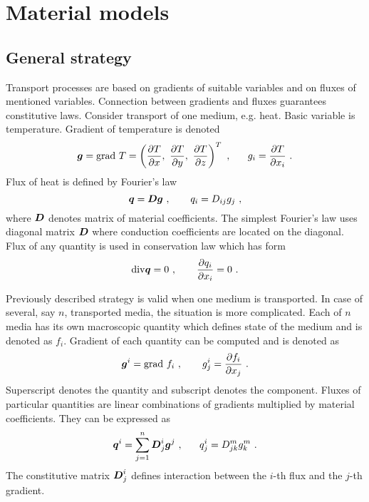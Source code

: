 \chapter{Material models}
\label{matmodels}

\section{General strategy}

Transport processes are based on gradients of suitable variables and on fluxes of mentioned variables.
Connection between gradients and fluxes guarantees constitutive laws. Consider transport of one medium,
e.g. heat. Basic variable is temperature. Gradient of temperature is denoted
\begin{equation}
\mbox{\boldmath$g$} = {\rm grad}\ T = \left(\mbox{$\displaystyle\frac{\partial{T}}{\partial{x}}$},\ \mbox{$\displaystyle\frac{\partial{T}}{\partial{y}}$},\ \mbox{$\displaystyle\frac{\partial{T}}{\partial{z}}$}\right)^T\ , \ \ \ \ \
g_i = \mbox{$\displaystyle\frac{\partial{T}}{\partial{x_i}}$}\ .
\end{equation}
Flux of heat is defined by Fourier's law
\begin{equation}
\mbox{\boldmath$q$} = \mbox{\boldmath$D$} \mbox{\boldmath$g$}\ ,\ \ \ \ \ \
q_i = D_{ij} g_j\ ,
\end{equation}
where $\mbox{\boldmath$D$}$ denotes matrix of material coefficients. The simplest Fourier's law uses diagonal matrix $\mbox{\boldmath$D$}$
where conduction coefficients are located on the diagonal.
Flux of any quantity is used in conservation law which has form
\begin{equation}
{\rm div} \mbf{q} = 0\ ,\ \ \ \ \ \
\ppd{q_i}{x_i} = 0\ .
\end{equation}

Previously described strategy is valid when one medium is transported. In case of several, say $n$, transported media,
the situation is more complicated. Each of $n$ media has its own macroscopic quantity which defines state of the medium
and is denoted as $f_i$. Gradient of each quantity can be computed and is denoted as
\begin{equation}
\mbox{\boldmath$g$}^i = {\rm grad}\ f_i\ ,\ \ \ \ \ \
g_j^i = \mbox{$\displaystyle\frac{\partial{f_i}}{\partial{x_j}}$}\ .
\end{equation}
Superscript denotes the quantity and subscript denotes the component.
Fluxes of particular quantities are linear combinations of gradients multiplied by material coefficients.
They can be expressed as
\begin{equation}
\mbox{\boldmath$q$}^i = \sum_{j=1}^n \mbox{\boldmath$D$}_j^i \mbox{\boldmath$g$}^j\ ,\ \ \ \ \
q_j^i = D_{jk}^m g_k^m\ .
\end{equation}
The constitutive matrix $\mbox{\boldmath$D$}_j^i$ defines interaction between the $i$-th flux and the $j$-th gradient.


